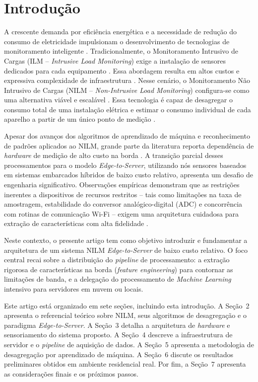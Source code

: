 \documentclass[12pt]{article}
\begin{document}
\section{Introdu\c{c}\~ao}

A crescente demanda por efici\^encia energ\'etica e a necessidade de redu\c{c}\~ao
do consumo de eletricidade impulsionam o desenvolvimento de tecnologias de
monitoramento inteligente \cite{ref2,ref6}. Tradicionalmente, o Monitoramento
Intrusivo de Cargas (ILM -- \textit{Intrusive Load Monitoring}) exige a
instala\c{c}\~ao de sensores dedicados para cada equipamento \cite{ref1,ref2}.
Essa abordagem resulta em altos custos e expressiva complexidade de
infraestrutura \cite{ref2,ref3}. Nesse cen\'ario, o Monitoramento N\~ao Intrusivo de
Cargas (NILM -- \textit{Non-Intrusive Load Monitoring}) configura-se como uma
alternativa vi\'avel e escal\'avel \cite{ref1,ref6}. Essa tecnologia \'e capaz de
desagregar o consumo total de uma instala\c{c}\~ao el\'etrica e estimar o consumo
individual de cada aparelho a partir de um \'unico ponto de medi\c{c}\~ao
\cite{ref1}.

Apesar dos avan\c{c}os dos algoritmos de aprendizado de m\'aquina e reconhecimento
de padr\~oes aplicados ao NILM, grande parte da literatura reporta depend\^encia
de \textit{hardware} de medi\c{c}\~ao de alto custo na borda \cite{ref6,ref7}. A
transi\c{c}\~ao parcial desses processamentos para o modelo
\textit{Edge-to-Server}, utilizando n\'os sensores baseados em sistemas embarcados
h\'ibridos de baixo custo relativo, apresenta um desafio de engenharia
significativo. Observa\c{c}\~oes emp\'iricas demonstram que as restri\c{c}\~oes
inerentes a dispositivos de recursos restritos -- tais como limita\c{c}\~oes na
taxa de amostragem, estabilidade do conversor anal\'ogico-digital (ADC) e
concorr\^encia com rotinas de comunica\c{c}\~ao Wi-Fi -- exigem uma arquitetura
cuidadosa para extra\c{c}\~ao de caracter\'isticas com alta fidelidade
\cite{ref8}.

Neste contexto, o presente artigo tem como objetivo introduzir e fundamentar a
arquitetura de um sistema NILM \textit{Edge-to-Server} de baixo custo relativo.
O foco central recai sobre a distribui\c{c}\~ao do \textit{pipeline} de
processamento: a extra\c{c}\~ao rigorosa de caracter\'isticas na borda
(\textit{feature engineering}) para contornar as limita\c{c}\~oes de banda, e a
delega\c{c}\~ao do processamento de \textit{Machine Learning} intensivo para
servidores em nuvem ou locais.

Este artigo est\'a organizado em sete se\c{c}\~oes, incluindo esta introdu\c{c}\~ao.
A Se\c{c}\~ao~2 apresenta o referencial te\'orico sobre NILM, seus algoritmos de
desagrega\c{c}\~ao e o paradigma \textit{Edge-to-Server}. A Se\c{c}\~ao~3 detalha
a arquitetura de \textit{hardware} e sensoriamento do sistema proposto. A
Se\c{c}\~ao~4 descreve a infraestrutura de servidor e o \textit{pipeline} de
aquisi\c{c}\~ao de dados. A Se\c{c}\~ao~5 apresenta a metodologia de
desagrega\c{c}\~ao por aprendizado de m\'aquina. A Se\c{c}\~ao~6 discute os
resultados preliminares obtidos em ambiente residencial real. Por fim, a
Se\c{c}\~ao~7 apresenta as considera\c{c}\~oes finais e os pr\'oximos passos.
\end{document}
